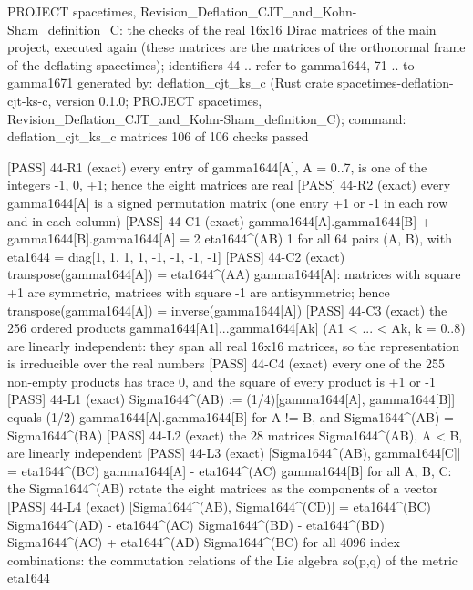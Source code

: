 \documentclass[
  10pt,
]{article}
\newenvironment{Shaded}{}{}
\newcommand{\NormalTok}[1]{#1}
\begin{document}
\begin{Shaded}
\begin{Highlighting}[]
\NormalTok{PROJECT spacetimes, Revision\_Deflation\_CJT\_and\_Kohn{-}Sham\_definition\_C: the checks of the real 16x16 Dirac matrices of the main project, executed again (these matrices are the matrices of the orthonormal frame of the deflating spacetimes); identifiers 44{-}.. refer to gamma1644, 71{-}.. to gamma1671}
\NormalTok{generated by: deflation\_cjt\_ks\_c (Rust crate spacetimes{-}deflation{-}cjt{-}ks{-}c, version 0.1.0; PROJECT spacetimes, Revision\_Deflation\_CJT\_and\_Kohn{-}Sham\_definition\_C); command: deflation\_cjt\_ks\_c matrices}
\NormalTok{106 of 106 checks passed}

\NormalTok{[PASS] 44{-}R1  (exact) every entry of gamma1644[A], A = 0..7, is one of the integers {-}1, 0, +1; hence the eight matrices are real}
\NormalTok{[PASS] 44{-}R2  (exact) every gamma1644[A] is a signed permutation matrix (one entry +1 or {-}1 in each row and in each column)}
\NormalTok{[PASS] 44{-}C1  (exact) gamma1644[A].gamma1644[B] + gamma1644[B].gamma1644[A] = 2 eta1644\^{}(AB) 1 for all 64 pairs (A, B), with eta1644 = diag[1, 1, 1, 1, {-}1, {-}1, {-}1, {-}1]}
\NormalTok{[PASS] 44{-}C2  (exact) transpose(gamma1644[A]) = eta1644\^{}(AA) gamma1644[A]: matrices with square +1 are symmetric, matrices with square {-}1 are antisymmetric; hence transpose(gamma1644[A]) = inverse(gamma1644[A])}
\NormalTok{[PASS] 44{-}C3  (exact) the 256 ordered products gamma1644[A1]...gamma1644[Ak] (A1 \textless{} ... \textless{} Ak, k = 0..8) are linearly independent: they span all real 16x16 matrices, so the representation is irreducible over the real numbers}
\NormalTok{[PASS] 44{-}C4  (exact) every one of the 255 non{-}empty products has trace 0, and the square of every product is +1 or {-}1}
\NormalTok{[PASS] 44{-}L1  (exact) Sigma1644\^{}(AB) := (1/4)[gamma1644[A], gamma1644[B]] equals (1/2) gamma1644[A].gamma1644[B] for A != B, and Sigma1644\^{}(AB) = {-}Sigma1644\^{}(BA)}
\NormalTok{[PASS] 44{-}L2  (exact) the 28 matrices Sigma1644\^{}(AB), A \textless{} B, are linearly independent}
\NormalTok{[PASS] 44{-}L3  (exact) [Sigma1644\^{}(AB), gamma1644[C]] = eta1644\^{}(BC) gamma1644[A] {-} eta1644\^{}(AC) gamma1644[B] for all A, B, C: the Sigma1644\^{}(AB) rotate the eight matrices as the components of a vector}
\NormalTok{[PASS] 44{-}L4  (exact) [Sigma1644\^{}(AB), Sigma1644\^{}(CD)] = eta1644\^{}(BC) Sigma1644\^{}(AD) {-} eta1644\^{}(AC) Sigma1644\^{}(BD) {-} eta1644\^{}(BD) Sigma1644\^{}(AC) + eta1644\^{}(AD) Sigma1644\^{}(BC) for all 4096 index combinations: the commutation relations of the Lie algebra so(p,q) of the metric eta1644}

\end{Highlighting}
\end{Shaded}
\end{document}
